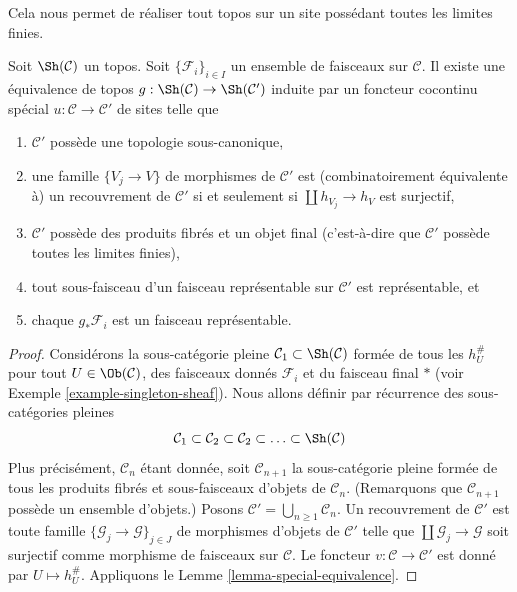 \noindent
Cela nous permet de réaliser tout topos sur un site possédant
toutes les limites finies.

\begin{lemma}
\label{lemma-topos-good-site}
Soit $\Sh(\mathcal{C})$ un topos. Soit $\{\mathcal{F}_i\}_{i \in I}$
un ensemble de faisceaux sur $\mathcal{C}$. Il existe une équivalence de topos
$g : \Sh(\mathcal{C}) \to \Sh(\mathcal{C}')$ induite par un foncteur
cocontinu spécial $u : \mathcal{C} \to \mathcal{C}'$ de sites
telle que
\begin{enumerate}
\item $\mathcal{C}'$ possède une topologie sous-canonique,
\item une famille $\{V_j \to V\}$ de morphismes de $\mathcal{C}'$
est (combinatoirement équivalente à) un recouvrement de $\mathcal{C}'$
si et seulement si $\coprod h_{V_j} \to h_V$ est surjectif,
\item $\mathcal{C}'$ possède des produits fibrés et un objet final
(c’est-à-dire que $\mathcal{C}'$ possède toutes les limites finies),
\item tout sous-faisceau d’un faisceau représentable sur $\mathcal{C}'$
est représentable, et
\item chaque $g_*\mathcal{F}_i$ est un faisceau représentable.
\end{enumerate}
\end{lemma}

\begin{proof}
Considérons la sous-catégorie pleine
$\mathcal{C}_1 \subset \Sh(\mathcal{C})$ formée de tous les
$h_U^\#$ pour tout $U \in \Ob(\mathcal{C})$, des faisceaux donnés
$\mathcal{F}_i$ et du faisceau final $*$ (voir
Exemple \ref{example-singleton-sheaf}). Nous allons définir par récurrence
des sous-catégories pleines
$$
\mathcal{C}_1 \subset \mathcal{C}_2 \subset \mathcal{C}_2 \subset \ldots
\subset \Sh(\mathcal{C})
$$
Plus précisément, $\mathcal{C}_n$ étant donnée, soit $\mathcal{C}_{n + 1}$ la sous-catégorie pleine
formée de tous les produits fibrés et sous-faisceaux d’objets
de $\mathcal{C}_n$. (Remarquons que $\mathcal{C}_{n + 1}$ possède un ensemble
d’objets.) Posons
$\mathcal{C}' = \bigcup_{n \geq 1} \mathcal{C}_n$.
Un recouvrement de $\mathcal{C}'$ est toute famille
$\{\mathcal{G}_j \to \mathcal{G}\}_{j \in J}$ de morphismes d’objets
de $\mathcal{C}'$ telle que
$\coprod \mathcal{G}_j \to \mathcal{G}$ soit surjectif
comme morphisme de faisceaux sur $\mathcal{C}$.
Le foncteur $v : \mathcal{C} \to \mathcal{C'}$ est donné par
$U \mapsto h_U^\#$. Appliquons le
Lemme \ref{lemma-special-equivalence}.
\end{proof}

